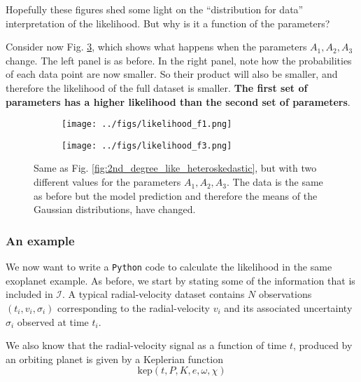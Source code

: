 \documentclass[a4paper,11pt]{article}
\begin{document}
Hopefully these figures shed some light on the ``distribution for data'' interpretation of the likelihood.
But why is it a function of the parameters?

Consider now Fig. \ref{fig:like_two_functions}, which shows what happens when the parameters $A_1, A_2, A_3$ change.
The left panel is as before. In the right panel, note how the probabilities of each data point are now smaller.
So their product will also be smaller, and therefore the likelihood of the full dataset is smaller.
\textbf{The first set of parameters has a higher likelihood than the second set of parameters}.



\begin{figure}
  \centering
  \begin{subfigure}{.5\textwidth}
    \centering
    \texttt{[image: ../figs/likelihood\_f1.png]}
    \label{fig:sub1}
  \end{subfigure}%
  \begin{subfigure}{.5\textwidth}
    \centering
    \texttt{[image: ../figs/likelihood\_f3.png]}
    \label{fig:sub2}
  \end{subfigure}
  \caption{Same as Fig. \ref{fig:2nd_degree_like_heteroskedastic}, but with two different values for the parameters $A_1, A_2, A_3$.
           The data is the same as before but the model prediction and therefore the means of the Gaussian distributions, have changed. }
  \label{fig:like_two_functions}
\end{figure}



\subsubsection{An example} %
\label{ssub:an_example}

  We now want to write a \texttt{Python} code to calculate the likelihood in the same exoplanet example.
  As before, we start by stating some of the information that is included in $\mathcal{I}$.
  A typical radial-velocity dataset contains $N$ observations $(t_i, v_i, \sigma_i)$ 
  corresponding to the radial-velocity $v_i$ and its associated uncertainty $\sigma_i$ observed at time $t_i$.

  We also know that the radial-velocity signal as a function of time $t$, produced by an orbiting planet 
  is given by a Keplerian function 
  \[\text{kep}(t,P,K,e,\omega,\chi)\]
\end{document}
